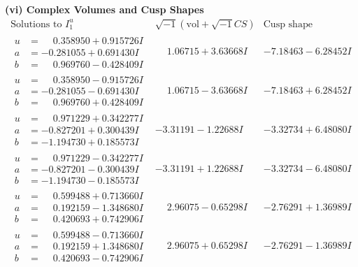 \documentclass[1p]{elsarticle_modified}
\theoremstyle{definition}
\newcommand{\I}{\sqrt{-1}}
\begin{document}
\newpage\flushleft \textbf{(vi) Complex Volumes and Cusp Shapes}
$$\begin{array}{c|c|c}  
\text{Solutions to }I^u_{1}& \I (\text{vol} + \sqrt{-1}CS) & \text{Cusp shape}\\
 \hline 
\begin{aligned}
u &= \phantom{-}0.358950 + 0.915726 I \\
a &= -0.281055 + 0.691430 I \\
b &= \phantom{-}0.969760 - 0.428409 I\end{aligned}
 & \phantom{-}1.06715 + 3.63668 I & -7.18463 - 6.28452 I \\ \hline\begin{aligned}
u &= \phantom{-}0.358950 - 0.915726 I \\
a &= -0.281055 - 0.691430 I \\
b &= \phantom{-}0.969760 + 0.428409 I\end{aligned}
 & \phantom{-}1.06715 - 3.63668 I & -7.18463 + 6.28452 I \\ \hline\begin{aligned}
u &= \phantom{-}0.971229 + 0.342277 I \\
a &= -0.827201 + 0.300439 I \\
b &= -1.194730 + 0.185573 I\end{aligned}
 & -3.31191 - 1.22688 I & -3.32734 + 6.48080 I \\ \hline\begin{aligned}
u &= \phantom{-}0.971229 - 0.342277 I \\
a &= -0.827201 - 0.300439 I \\
b &= -1.194730 - 0.185573 I\end{aligned}
 & -3.31191 + 1.22688 I & -3.32734 - 6.48080 I \\ \hline\begin{aligned}
u &= \phantom{-}0.599488 + 0.713660 I \\
a &= \phantom{-}0.192159 - 1.348680 I \\
b &= \phantom{-}0.420693 + 0.742906 I\end{aligned}
 & \phantom{-}2.96075 - 0.65298 I & -2.76291 + 1.36989 I \\ \hline\begin{aligned}
u &= \phantom{-}0.599488 - 0.713660 I \\
a &= \phantom{-}0.192159 + 1.348680 I \\
b &= \phantom{-}0.420693 - 0.742906 I\end{aligned}
 & \phantom{-}2.96075 + 0.65298 I & -2.76291 - 1.36989 I \\ \hline\begin{aligned}

\end{aligned}
\end{array}$$
\end{document}
